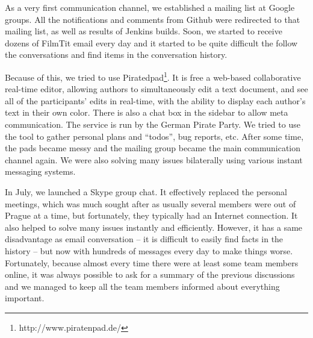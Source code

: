 {As a very first communication channel, we established a mailing list at Google groups. All the notifications and comments from Github were redirected to that mailing list, as well as results of Jenkins builds. Soon, we started to receive dozens of FilmTit email every day and it started to be quite difficult the follow the conversations and find items in the conversation history.

Because of this, we tried to use Piratedpad\footnote{http://www.piratenpad.de/}. It is free a web-based collaborative real-time editor, allowing authors to simultaneously edit a text document, and see all of the participants' edits in real-time, with the ability to display each author's text in their own color. There is also a chat box in the sidebar to allow meta communication. The service is run by the German Pirate Party. We tried to use the tool to gather personal plans and ``todos'', bug reports, etc. After some time, the pads became messy and the mailing group became the main communication channel again. We were also solving many issues bilaterally using various instant messaging systems.

In July, %
we launched a Skype group chat. It effectively replaced the personal meetings, which was much sought after as usually several members were out of Prague at a time, but fortunately, they typically had an Internet connection.
It also helped to solve many issues instantly and efficiently.
However, it has a same disadvantage as email conversation -- it is difficult to easily find facts in the history -- but now with hundreds of messages every day to make things worse.
Fortunately, because almost every time there were at least some team members online, it was always possible to ask for a summary of the previous discussions and we managed to keep all the team members informed about everything important.



}
